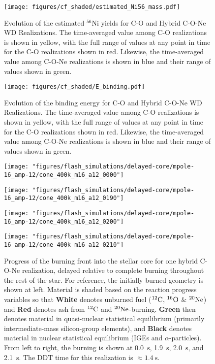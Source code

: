 \documentclass[iop,apj]{emulateapj}
\newcommand{\C}[1]{\ensuremath{{}^{#1}{\rm C}}}
\newcommand{\Ox}[1]{\ensuremath{{}^{#1}{\rm O}}}
\newcommand{\Ne}[1]{\ensuremath{{}^{#1}{\rm Ne}}}
\newcommand{\unitstyle}[1]{\ensuremath{\mathrm{#1}}}
\newcommand{\second}{\unitstyle{s}}
\begin{document}
\begin{figure}[!ht]
\texttt{[image: figures/cf\_shaded/estimated\_Ni56\_mass.pdf]}
\caption{\label{fig:est_ni_mass} Evolution of the estimated $^{56}$Ni yields for C-O and Hybrid C-O-Ne WD Realizations. The time-averaged value among C-O realizations is shown in yellow, with the full range of values at any point in time for the C-O realizations shown in red. Likewise, the time-averaged value among C-O-Ne realizations is shown in blue and their range of values shown in green.}
\end{figure}
\begin{figure}[!ht]
	\texttt{[image: figures/cf\_shaded/E\_binding.pdf]}
	\caption{\label{fig:e_binding} Evolution of the binding energy for C-O and Hybrid C-O-Ne WD Realizations. The time-averaged value among C-O realizations is shown in yellow, with the full range of values at any point in time for the C-O realizations shown in red. Likewise, the time-averaged value among C-O-Ne realizations is shown in blue and their range of values shown in green.}
\end{figure}

\begin{figure*}[!ht]
  \begin{minipage}{0.24\textwidth}
    \texttt{[image: "figures/flash\_simulations/delayed-core/mpole-16\_amp-12/cone\_400k\_m16\_a12\_0000"]}
  \end{minipage} \hfill
  \begin{minipage}{0.24\textwidth}
    \texttt{[image: "figures/flash\_simulations/delayed-core/mpole-16\_amp-12/cone\_400k\_m16\_a12\_0190"]}
  \end{minipage} \hfill 
  \begin{minipage}{0.24\textwidth}
    \texttt{[image: "figures/flash\_simulations/delayed-core/mpole-16\_amp-12/cone\_400k\_m16\_a12\_0200"]}
  \end{minipage} \hfill 
  \begin{minipage}{0.24\textwidth}
    \texttt{[image: "figures/flash\_simulations/delayed-core/mpole-16\_amp-12/cone\_400k\_m16\_a12\_0210"]}
  \end{minipage} \caption{\label{fig:cone_delayed_core} Progress of the burning front into the stellar core for one hybrid C-O-Ne realization, delayed relative to complete burning throughout the rest of the star. For reference, the initially burned geometry is shown at left. Material is shaded based on the reaction progress variables so that \textbf{White} denotes unburned fuel (\C{12}, \Ox{16} \& \Ne{20}) and \textbf{Red} denotes ash from \C{12} and \Ne{20}-burning. \textbf{Green} then denotes material in quasi-nuclear statistical equilibrium (primarily intermediate-mass silicon-group elements), and \textbf{Black} denotes material in nuclear statistical equilibrium (IGEs and $\alpha$-particles). From left to right, the burning is shown at 0.0~\second, 1.9~\second, 2.0~\second, and 2.1~\second. The DDT time for this realization is $\approx \mathrm{1.4}~\second$.}
\end{figure*}
\end{document}
